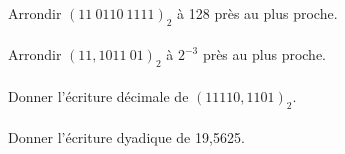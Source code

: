 \documentclass[a4paper,12pt,eval,firamath]{nsi}
\begin{document}
\maketitle

Arrondir $(11\ 0110\ 1111)_2$ à 128 près au plus proche.\\

\\


Arrondir $(11, 1011\ 01)_2$ à $2^{-3}$ près au plus proche.\\

\\

Donner l'écriture décimale de $(11110,1101)_2$.\\

\\

Donner l'écriture dyadique de 19,5625.\\

\end{document}
